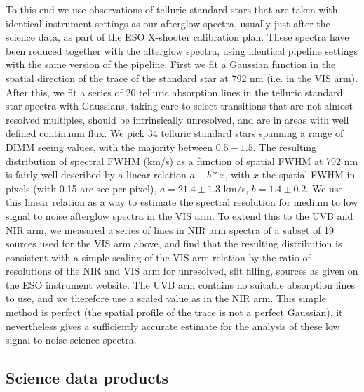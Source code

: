 \documentclass{aa}    %
\begin{document}
To this end we use observations of telluric standard stars that are taken with
identical instrument settings as our afterglow spectra, usually just after the
science data, as part of the ESO X-shooter calibration plan. These spectra have
been reduced together with the afterglow spectra, using identical pipeline
settings with the same version of the pipeline. First we fit a Gaussian function
in the spatial direction of the trace of the standard star at 792 nm (i.e. in
the VIS arm). After this, we fit a series of  20 telluric absorption lines in
the telluric standard star spectra with Gaussians, taking care to select
transitions that are not almost-resolved multiples, should be intrinsically
unresolved, and are in areas with well defined continuum flux. We pick 34
telluric standard stars spanning a range of DIMM seeing values, with the
majority between $0.5-1.5 $\arcsec. The resulting distribution of spectral FWHM
(km/s) as a function of spatial FWHM at 792 nm is fairly well described by a
linear relation $a + b*x$, with $x$ the spatial FWHM in pixels (with 0.15 arc
sec per pixel),  $a= 21.4 \pm 1.3$ km/s, $b=1.4 \pm 0.2$. We use this linear
relation as a way to estimate the spectral resolution for medium to low signal
to noise afterglow spectra in the VIS arm. To extend this to the UVB and NIR
arm, we measured a series of lines in NIR arm spectra of a subset of 19 sources
used for the VIS arm above, and find that the resulting distribution is
consistent with a simple scaling of the VIS arm relation by the ratio of
resolutions of the NIR and VIS arm for unresolved, slit filling, sources as
given on the ESO instrument website. The UVB arm contains no suitable absorption
lines to use, and we therefore use a scaled value as in the NIR arm. This simple
method is perfect (the spatial profile of the trace is not a perfect Gaussian),
it nevertheless gives a sufficiently accurate estimate for the analysis of these
low signal to noise science spectra.


\subsection{Science data products} \label{products}

\end{document}
